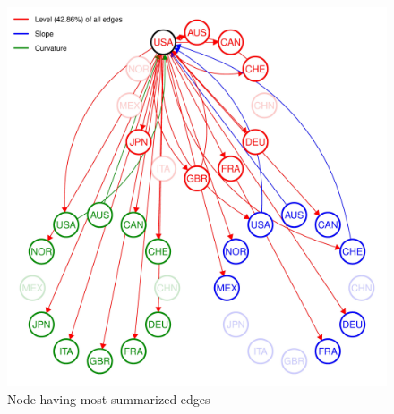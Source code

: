 \documentclass[12pt,bibliography=totoc]{article}
\begin{document}



\begin{figure}[H]

\includegraphics[width=13.5cm]{USA_B_1_plot_2004-07-01_2019-12-31_0.01-page-001}
\centering
\caption{Node having most summarized edges}

\end{figure}
\end{document}
